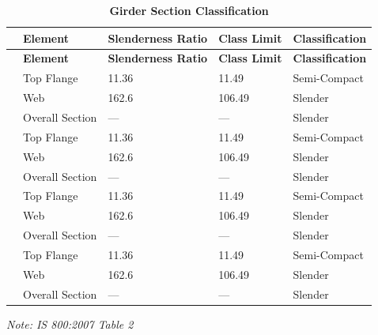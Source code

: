 \documentclass[12pt,a4paper]{report}
\numberwithin{table}{chapter}
\numberwithin{figure}{chapter}
\begin{document}
\vspace{1em}
\begin{longtable}{|C{2.5cm}|L{3cm}|C{3.5cm}|C{2.5cm}|>{\centering\arraybackslash}p{4.0cm}|}
\caption{\textbf{Girder Section Classification}}
\hline
\textbf{} & \textbf{Element} & \textbf{Slenderness Ratio} & \textbf{Class Limit} & \textbf{Classification} \\[6pt]
\hline
\endfirsthead

\hline

\textbf{} & \textbf{Element} & \textbf{Slenderness Ratio} & \textbf{Class Limit} & \textbf{Classification} \\[6pt]

\hline

\endhead

 & Top Flange & 11.36 & 11.49 & Semi-Compact \\[6pt]
 & Web & 162.6 & 106.49 & Slender \\[6pt]
 & Overall Section & --- & --- & Slender \\[6pt]
\hline
{} & Top Flange & 11.36 & 11.49 & Semi-Compact \\[6pt]
 & Web & 162.6 & 106.49 & Slender \\[6pt]
 & Overall Section & --- & --- & Slender \\[6pt]
\hline
{} & Top Flange & 11.36 & 11.49 & Semi-Compact \\[6pt]
 & Web & 162.6 & 106.49 & Slender \\[6pt]
 & Overall Section & --- & --- & Slender \\[6pt]
\hline
{} & Top Flange & 11.36 & 11.49 & Semi-Compact \\[6pt]
 & Web & 162.6 & 106.49 & Slender \\[6pt]
 & Overall Section & --- & --- & Slender \\[6pt]
\hline
\end{longtable}
\noindent\textit{Note: IS 800:2007 Table 2}
\newpage
\vspace{1em}
\end{document}
